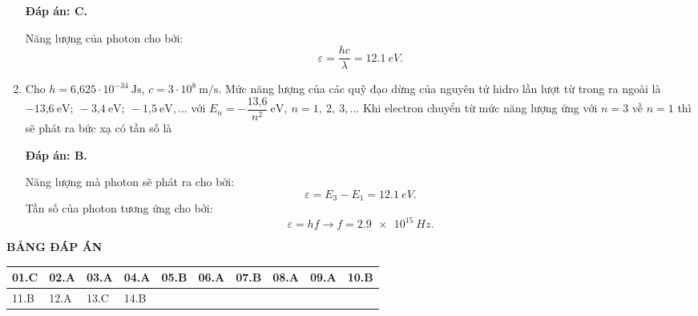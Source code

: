 \begin{enumerate}[label=\bfseries Câu \arabic*:]
	\loigiai
	{		\textbf{Đáp án: C.}
		
Năng lượng của photon cho bởi:
$$
	\varepsilon = \dfrac{hc}{\lambda} = \SI{12,1}{eV}.
$$
		
	}
	
	\item {} 
	
	\cauhoi
	{Cho $h=\text{6,625}\cdot 10^{-34}\ \text{Js}$, $c=3\cdot 10^8\ \text{m/s}$. Mức năng lượng của các quỹ đạo dừng của nguyên tử hidro lần lượt từ trong ra ngoài là $-\text{13,6}\ \text{eV}; \ -\text{3,4}\ \text{eV};\ -\text{1,5}\ \text{eV},...$ với $E_n=-\dfrac{\text{13,6}}{n^2}\ \text{eV}, \ n=1, \ 2, \ 3,...$   Khi electron chuyển từ mức năng lượng ứng với $n = 3$ về $n = 1$ thì sẽ phát ra bức xạ có tần số là 
	}
	
	\loigiai
	{		\textbf{Đáp án: B.}
		
Năng lượng mà photon sẽ phát ra cho bởi:
$$
	\varepsilon = E_{3} - E_{1} = \SI{12,1}{eV}.
$$
Tần số của photon tương ứng cho bởi:
$$
	\varepsilon = hf \rightarrow f = \SI{2,9 e15}{Hz}.
$$
		
	}
	
\end{enumerate}

\loigiai
{
	\begin{center}
		\textbf{BẢNG ĐÁP ÁN}
	\end{center}
	\begin{center}
		\begin{tabular}{|m{2.8em}|m{2.8em}|m{2.8em}|m{2.8em}|m{2.8em}|m{2.8em}|m{2.8em}|m{2.8em}|m{2.8em}|m{2.8em}|}
			\hline
			01.C  & 02.A  & 03.A  & 04.A  & 05.B  & 06.A  & 07.B & 08.A & 09.A & 10.B \\
			\hline
			11.B  & 12.A  & 13.C  & 14.B  &  &  & &  & & \\
			\hline
			
		\end{tabular}
	\end{center}
}

